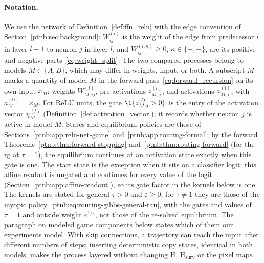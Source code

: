 \paragraph{Notation.}
We use the network of Definition~\ref{def:ffn_relu} with the edge convention of Section~\ref{ptnb:sec:background}: $W^{(l)}_{ij}$ is the weight of the edge from predecessor $i$ in layer $l-1$ to neuron $j$ in layer $l$, and $W^{(l,\kappa)}_{ij}\ge0$, $\kappa\in\{+,-\}$, are its positive and negative parts~\eqref{eq:weight_split}. The two compared processes belong to models $M\in\{A,B\}$, which may differ in weights, input, or both. A subscript $M$ marks a quantity of model $M$ in the forward pass~\eqref{eq:forward_recursion} on its own input $x_M$: weights $W^{(l)}_{M,ij}$, pre-activations $z^{(l)}_{M,j}$, and activations $a^{(l)}_{M,i}$, with $a^{(0)}_M=x_M$. For ReLU units, the gate $\1\{z^{(l)}_{M,j}>0\}$ is the entry of the activation vector $\chi^{(l)}_M$ (Definition~\ref{def:activation_vector}); it records whether neuron $j$ is active in model $M$. States and equilibrium policies are those of Sections~\ref{ptnb:app:relu-net-game} and~\ref{ptnb:app:routing-formal}; by the forward Theorems~\ref{ptnb:thm:forward-stopping} and~\ref{ptnb:thm:routing-forward} (for the \ac{rg} at $\tau=1$), the equilibrium continues at an activation state exactly when this gate is one. The start state is the exception when it sits on a classifier logit: this affine readout is ungated and continues for every value of the logit (Section~\ref{ptnb:app:affine-readout}), so its gate factor in the kernels below is one. The kernels are stated for general $\tau>0$ and $\varepsilon\ge0$; for $\tau\neq1$ they are those of the myopic policy~\eqref{ptnb:eq:routing-gibbs-general-tau}, with the gates and values of $\tau=1$ and outside weight $\varepsilon^{1/\tau}$, not those of the re-solved equilibrium. The paragraph on modeled game components below states which of them our experiments model. With skip connections, a trajectory can reach the input after different numbers of steps; inserting deterministic copy states, identical in both models, makes the process layered without changing $\mathrm H$, $\mathrm H_{\mathrm{surv}}$ or the pixel maps.

